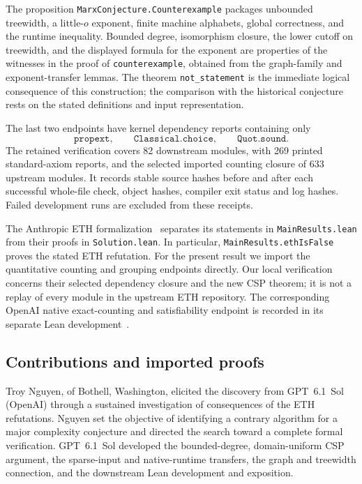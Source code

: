 \documentclass[11pt,reqno]{amsart}
\numberwithin{equation}{section}
\theoremstyle{definition}
\theoremstyle{remark}
\begin{document}
The proposition \texttt{MarxConjecture.Counterexample} packages unbounded treewidth, a little-$o$ exponent, finite machine alphabets, global correctness, and the runtime inequality. Bounded degree, isomorphism closure, the lower cutoff on treewidth, and the displayed formula for the exponent are properties of the witnesses in the proof of \texttt{counterexample}, obtained from the graph-family and exponent-transfer lemmas. The theorem \texttt{not\_statement} is the immediate logical consequence of this construction; the comparison with the historical conjecture rests on the stated definitions and input representation.

The last two endpoints have kernel dependency reports containing only
\[
 \texttt{propext},\qquad
 \texttt{Classical.choice},\qquad
 \texttt{Quot.sound}.
\]
The retained verification covers 82 downstream modules, with 269 printed standard-axiom reports, and the selected imported counting closure of 633 upstream modules. It records stable source hashes before and after each successful whole-file check, object hashes, compiler exit status and log hashes. Failed development runs are excluded from these receipts.

The Anthropic ETH formalization~\cite{AnthropicLean} separates its statements in \texttt{MainResults.lean} from their proofs in \texttt{Solution.lean}. In particular, \texttt{MainResults.ethIsFalse} proves the stated ETH refutation. For the present result we import the quantitative counting and grouping endpoints directly. Our local verification concerns their selected dependency closure and the new CSP theorem; it is not a replay of every module in the upstream ETH repository. The corresponding OpenAI native exact-counting and satisfiability endpoint is recorded in its separate Lean development~\cite{OpenAILean}.

\subsection{Contributions and imported proofs}\label{sec:provenance}

Troy Nguyen, of Bothell, Washington, elicited the discovery from GPT~6.1~Sol (OpenAI) through a sustained investigation of consequences of the ETH refutations. Nguyen set the objective of identifying a contrary algorithm for a major complexity conjecture and directed the search toward a complete formal verification. GPT~6.1~Sol developed the bounded-degree, domain-uniform CSP argument, the sparse-input and native-runtime transfers, the graph and treewidth connection, and the downstream Lean development and exposition.
\end{document}
